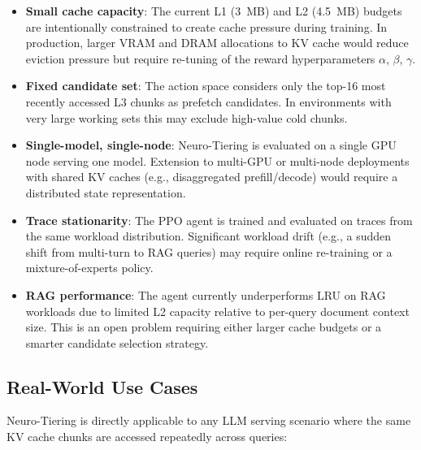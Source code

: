 \documentclass[conference]{IEEEtran}
\begin{document}
\begin{itemize}
    \item \textbf{Small cache capacity}: The current L1 (3~MB) and L2 (4.5~MB) budgets are intentionally constrained to create cache pressure during training. In production, larger VRAM and DRAM allocations to KV cache would reduce eviction pressure but require re-tuning of the reward hyperparameters $\alpha$, $\beta$, $\gamma$.
    \item \textbf{Fixed candidate set}: The action space considers only the top-16 most recently accessed L3 chunks as prefetch candidates. In environments with very large working sets this may exclude high-value cold chunks.
    \item \textbf{Single-model, single-node}: Neuro-Tiering is evaluated on a single GPU node serving one model. Extension to multi-GPU or multi-node deployments with shared KV caches (e.g., disaggregated prefill/decode) would require a distributed state representation.
    \item \textbf{Trace stationarity}: The PPO agent is trained and evaluated on traces from the same workload distribution. Significant workload drift (e.g., a sudden shift from multi-turn to RAG queries) may require online re-training or a mixture-of-experts policy.
    \item \textbf{RAG performance}: The agent currently underperforms LRU on RAG workloads due to limited L2 capacity relative to per-query document context size. This is an open problem requiring either larger cache budgets or a smarter candidate selection strategy.
\end{itemize}

\subsection{Real-World Use Cases}

Neuro-Tiering is directly applicable to any LLM serving scenario where the same KV cache chunks are accessed repeatedly across queries:
\end{document}

